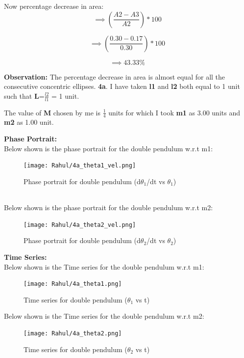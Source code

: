 \documentclass[11pt]{scrartcl} %
\begin{document}
Now percentage decrease in area:
\begin{equation*}
\implies (\frac{A2-A3}{A2})*100
\end{equation*}

\begin{equation*}
\implies (\frac{0.30-0.17}{0.30})*100
\end{equation*}

\begin{equation*}
\implies 43.33\%
\end{equation*}

\textbf{Observation:}
The percentage decrease in area is almost equal for all the consecutive concentric ellipses.
\newline
\textbf{4a}.
I have taken \textbf{l1} and \textbf{l2} both equal to 1 unit such that \textbf{L}=$\frac{l2}{l1}$ = 1 unit.

The value of \textbf{M} chosen by me is $\frac{1}{4}$ units for which I took \textbf{m1} as 3.00 units and \textbf{m2} as 1.00 unit.\newpage

\textbf{Phase Portrait:}\\
Below shown is the phase portrait for the double pendulum w.r.t m1:
\begin{figure}[h] %
	\centering
	\texttt{[image: Rahul/4a\_theta1\_vel.png]} %
	\caption{Phase portrait for double pendulum (d$\theta_{1}$/dt vs $\theta_{1}$)}
\end{figure}
\\
Below shown is the phase portrait for the double pendulum w.r.t m2:
\begin{figure}[h] %
	\centering
	\texttt{[image: Rahul/4a\_theta2\_vel.png]} %
	\caption{Phase portrait for double pendulum (d$\theta_{2}$/dt vs $\theta_{2}$)}
\end{figure}
\newpage
\textbf{Time Series:}\\
Below shown is the Time series for the double pendulum w.r.t m1:
\begin{figure}[h] %
	\centering
	\texttt{[image: Rahul/4a\_theta1.png]} %
	\caption{Time series for double pendulum ($\theta_{1}$ vs t)}
\end{figure}

Below shown is the Time series for the double pendulum w.r.t m2:
\begin{figure}[h] %
	\centering
	\texttt{[image: Rahul/4a\_theta2.png]} %
	\caption{Time series for double pendulum ($\theta_{2}$ vs t)}
\end{figure}
\end{document}
